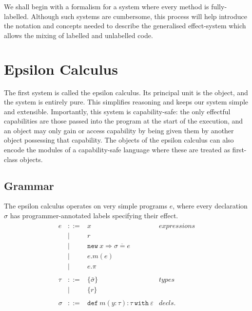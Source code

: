 \documentclass[a4paper,UKenglish]{lipics-v2016}
\newcommand{\kw}[1]{\mathtt{ #1 }~}
\newcommand{\kwa}[1]{\mathtt{ #1 }}
\begin{document}
We shall begin with a formalism for a system where every method is fully-labelled. Although such systems are cumbersome, this process will help introduce the notation and concepts needed to describe the generalised effect-system which allows the mixing of labelled and unlabelled code.

\section{Epsilon Calculus}

The first system is called the epsilon calculus. Its principal unit is the object, and the system is entirely pure. This simplifies reasoning and keeps our system simple and extensible. Importantly, this system is capability-safe: the only effectful capabilities are those passed into the program at the start of the execution, and an object may only gain or access capability by being given them by another object possessing that capability. The objects of the epsilon calculus can also encode the modules of a capability-safe language where these are treated as first-class objects.

\subsection{Grammar}

The epsilon calculus operates on very simple programs $e$, where every declaration $\sigma$ has programmer-annotated labels specifying their effect.
\[
\begin{array}{lll}

\begin{array}{lllr}

e & ::= & x & expressions \\
  		& | & r \\
		& | & \kwa{new}~x \Rightarrow \overline{\sigma = e} \\
 		& | & e.m(e)\\
 		& | & e.\pi\\
		&&\\

\tau & ::= & \{ \bar \sigma \} & types \\
		& | & \{ r \} \\
		&&\\
		
\sigma & ::= & \kw{def} m(y:\tau):\tau~\kw{with}\varepsilon  & decls. \\
		&&\\

\end{array}
\end{array}
\]
\end{document}
